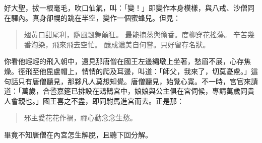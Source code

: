 好大聖，拔一根毫毛，吹口仙氣，叫：「變！」即變作本身模樣，與八戒、沙僧同在驛內。真身卻幌的跳在半空，變作一個蜜蜂兒。但見：
\begin{quote}
翅黃口甜尾利，隨風飄舞顛狂。
最能摘蕊與偷香。度柳穿花搖蕩。
辛苦幾番淘染，飛來飛去空忙。
釀成濃美自何嘗。只好留存名狀。
\end{quote}

你看他輕輕的飛入朝中，遠見那唐僧在國王左邊繡墩上坐著，愁眉不展，心存焦燥。徑飛至他毘盧帽上，悄悄的爬及耳邊，叫道：「師父，我來了，切莫憂慮。」這句話只有唐僧聽見，那夥凡人莫想知覺。唐僧聽見，始覺心寬。不一時，宮官來請道：「萬歲，合巹嘉筵已排設在鳷鵲宮中，娘娘與公主俱在宮伺候，專請萬歲同貴人會親也。」國王喜之不盡，即同駙馬進宮而去。正是那：
\begin{quote}
邪主愛花花作禍，禪心動念念生愁。
\end{quote}

畢竟不知唐僧在內宮怎生解脫，且聽下回分解。
